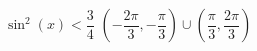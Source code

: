{ $\sin^{2} \left( x \right) < \dfrac{3}{4}$}
{ $\left( -\dfrac{2\pi}{3}, -\dfrac{\pi}{3} \right) \cup \left( \dfrac{\pi}{3}, \dfrac{2\pi}{3} \right)$}
